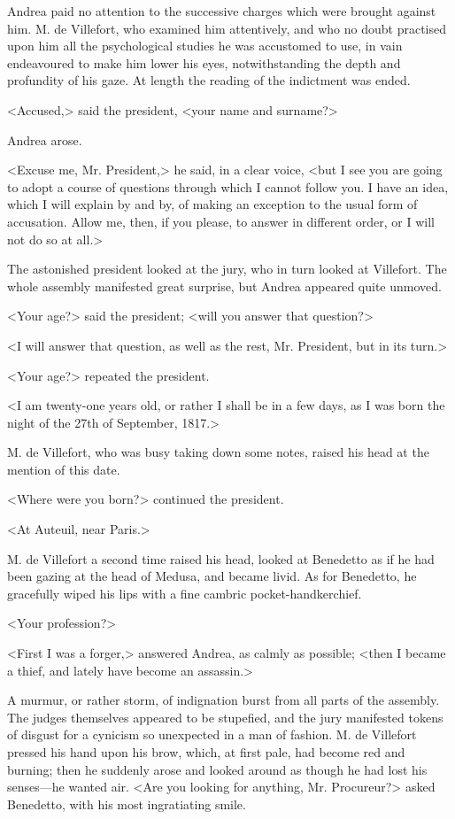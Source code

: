  Andrea paid no attention to the successive charges which were brought against him. M. de Villefort, who examined him attentively, and who no doubt practised upon him all the psychological studies he was accustomed to use, in vain endeavoured to make him lower his eyes, notwithstanding the depth and profundity of his gaze. At length the reading of the indictment was ended. 

 <Accused,> said the president, <your name and surname?> 

 Andrea arose. 

 <Excuse me, Mr. President,> he said, in a clear voice, <but I see you are going to adopt a course of questions through which I cannot follow you. I have an idea, which I will explain by and by, of making an exception to the usual form of accusation. Allow me, then, if you please, to answer in different order, or I will not do so at all.> 

 The astonished president looked at the jury, who in turn looked at Villefort. The whole assembly manifested great surprise, but Andrea appeared quite unmoved. 

 <Your age?> said the president; <will you answer that question?> 

 <I will answer that question, as well as the rest, Mr. President, but in its turn.> 

 <Your age?> repeated the president. 

 <I am twenty-one years old, or rather I shall be in a few days, as I was born the night of the 27th of September, 1817.> 

 M. de Villefort, who was busy taking down some notes, raised his head at the mention of this date. 

 <Where were you born?> continued the president. 

 <At Auteuil, near Paris.> 

 M. de Villefort a second time raised his head, looked at Benedetto as if he had been gazing at the head of Medusa, and became livid. As for Benedetto, he gracefully wiped his lips with a fine cambric pocket-handkerchief. 

 <Your profession?> 

 <First I was a forger,> answered Andrea, as calmly as possible; <then I became a thief, and lately have become an assassin.> 

 A murmur, or rather storm, of indignation burst from all parts of the assembly. The judges themselves appeared to be stupefied, and the jury manifested tokens of disgust for a cynicism so unexpected in a man of fashion. M. de Villefort pressed his hand upon his brow, which, at first pale, had become red and burning; then he suddenly arose and looked around as though he had lost his senses—he wanted air.  <Are you looking for anything, Mr. Procureur?> asked Benedetto, with his most ingratiating smile. 

